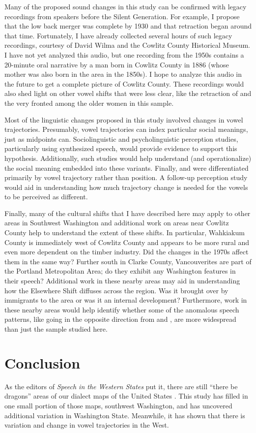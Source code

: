Many of the proposed sound changes in this study can be confirmed with legacy recordings from speakers before the Silent Generation. For example, I propose that the low back merger was complete by 1930 and that \trap retraction began around that time. Fortunately, I have already collected several hours of such legacy recordings, courtesy of David Wilma and the Cowlitz County Historical Museum. I have not yet analyzed this audio, but one recording from the 1950s contains a 20-minute oral narrative by a man born in Cowlitz County in 1886 (whose mother was also born in the area in the 1850s). I hope to analyze this audio in the future to get a complete picture of Cowlitz County. These recordings would also shed light on other vowel shifts that were less clear, like the retraction of \bin and the very fronted \ben among the older women in this sample.

Most of the linguistic changes proposed in this study involved changes in vowel trajectories. Presumably, vowel trajectories can index particular social meanings, just as midpoints can. Sociolinguistic and psycholinguistic perception studies, particularly using synthesized speech, would provide evidence to support this hypothesis. Additionally, such studies would help understand (and operationalize) the social meaning embedded into these variants. Finally, \lot and \thought were differentiated primarily by vowel trajectory rather than position. A follow-up perception study would aid in understanding how much trajectory change is needed for the vowels to be perceived as different.

Finally, many of the cultural shifts that I have described here may apply to other areas in Southwest Washington and additional work on areas near Cowlitz County help to understand the extent of these shifts. In particular, Wahkiakum County is immediately west of Cowlitz County and appears to be more rural and even more dependent on the timber industry. Did the changes in the 1970s affect them in the same way? Further south in Clarke County, Vancouverites are part of the Portland Metropolitan Area; do they exhibit any Washington features in their speech? Additional work in these nearby areas may aid in understanding how the Elsewhere Shift diffuses across the region. Was it brought over by immigrants to the area or was it an internal development? Furthermore, work in these nearby areas would help identify whether some of the anomalous speech patterns, like \ben going in the opposite direction from \ban and \bin, are more widespread than just the sample studied here.





\section{Conclusion}

As the editors of \textit{Speech in the Western States} put it, there are still ``there be dragons'' areas of our dialect maps of the United States \citep[172]{fridland_etal_2017_pads}. This study has filled in one small portion of those maps, southwest Washington, and has uncovered additional variation in Washington State. Meanwhile, it has shown that there is variation and change in vowel trajectories in the West.
